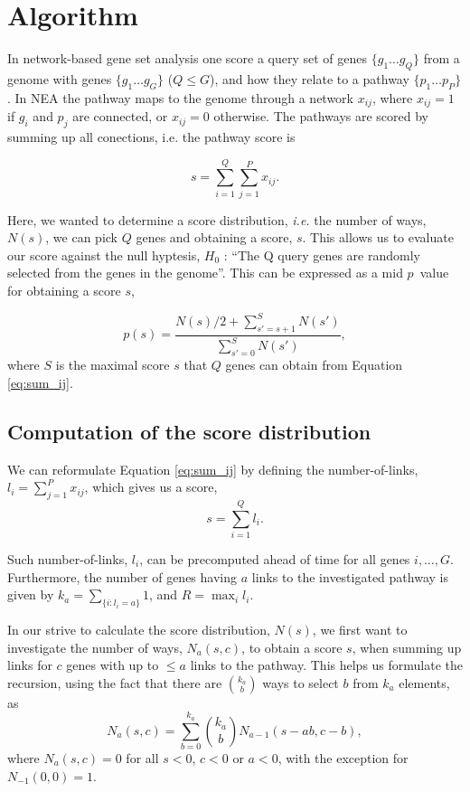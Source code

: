 \documentclass[a4paper,american]{lipics-v2016}
\begin{document}
\section*{Algorithm}

In network-based gene set analysis one score a query set of genes $ \{g_1 \ldots g_Q\} $ from a genome with genes $\{g_1 \ldots g_G\}$ ($Q \le G$), and how they relate to a pathway $\{p_1 \ldots p_P\}$. In NEA the pathway maps to the genome through a network ${x_{ij}}$, where $x_{ij}=1$ if $g_i$ and $p_j$ are connected, or $x_{ij}=0$ otherwise. The pathways are scored by summing up all conections, i.e. the pathway score is

\begin{equation}
s=\sum_{i=1}^Q\sum_{j=1}^P x_{ij}.
\label{eq:sum_ij}
\end{equation}

Here, we wanted to determine a score distribution, {\em i.e.} the number of ways, $N(s)$, we can pick $Q$ genes and obtaining a score, $s$. This allows us to evaluate our score against the null hyptesis, $H_0$ : ``The Q query genes are randomly selected from the genes in the genome''. This can be expressed as a mid $p$~value\cite{lancaster1961significance,hwang2001optimality} for obtaining a score $s$,

\begin{equation}
p(s)=\frac{N(s)/2 +\sum_{s'=s+1}^{S} N(s')}{\sum_{s'=0}^{S} N(s')},
\label{eq:pval}
\end{equation}
where $S$ is the maximal score $s$ that $Q$ genes can obtain from Equation \ref{eq:sum_ij}.

\subsection*{Computation of the score distribution}

We can reformulate Equation \ref{eq:sum_ij} by defining the number-of-links, $l_i=\sum_{j=1}^P x_{ij}$, which gives us a score,
\begin{equation}
s=\sum_{i=1}^Q l_i.
\label{eq:sum_i}
\end{equation}

Such number-of-links, $l_i$, can be precomputed ahead of time for all genes $i, \ldots, G$.
Furthermore, the number of genes having $a$ links to the investigated pathway is given by $k_a=\sum_{\{i:l_i=a\}}1$, and $R=\max_{i}{l_i}$.

In our strive to calculate the score distribution, $N(s)$, we first want to investigate the number of ways, $N_a(s,c)$, to obtain a score $s$, when summing up links for $c$ genes with up to $\le a$ links to the pathway. This helps us formulate the recursion, using the fact that there are $k_a \choose b$ ways to select $b$ from $k_a$ elements, as
\begin{equation}
N_a(s,c)=\sum_{b=0}^{k_a}{k_a \choose b} N_{a-1}(s-ab,c-b),
\end{equation}
where $N_a(s,c)=0$ for all $s<0$, $c<0$ or $a<0$, with the exception for $N_{-1}(0,0)=1$.
\end{document}
